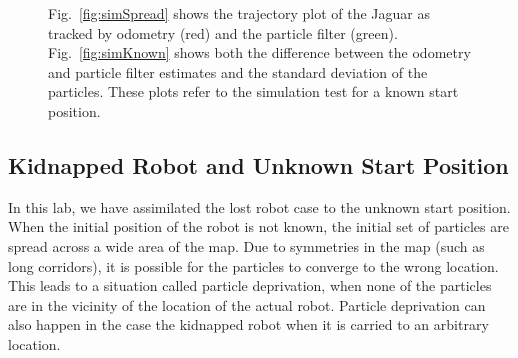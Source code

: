 \documentclass[conference]{../IEEEtran}
\begin{document}
\begin{figure}[t]
  \centering
  \hspace{.5 cm}
  \caption{Fig.~\ref{fig:simSpread} shows the trajectory plot of the Jaguar as tracked by
           odometry (red) and the particle filter (green). Fig.~\ref{fig:simKnown} shows both the
           difference between the odometry and particle filter estimates and the standard deviation
           of the particles. These plots refer to the simulation test for a known start position.}
\end{figure}

\subsection{Kidnapped Robot and Unknown Start Position}

In this lab, we have assimilated the lost robot case to the unknown start position. When
the initial position of the robot is not known, the initial set of particles are spread
across a wide area of the map.  Due to symmetries in the map (such as long corridors), it
is possible for the particles to converge to  the wrong location. This leads to a
situation called particle deprivation, when none of the particles are in the vicinity of
the location of the actual robot. Particle deprivation can also happen in the case the
kidnapped robot when it is carried to an arbitrary location.
\end{document}
